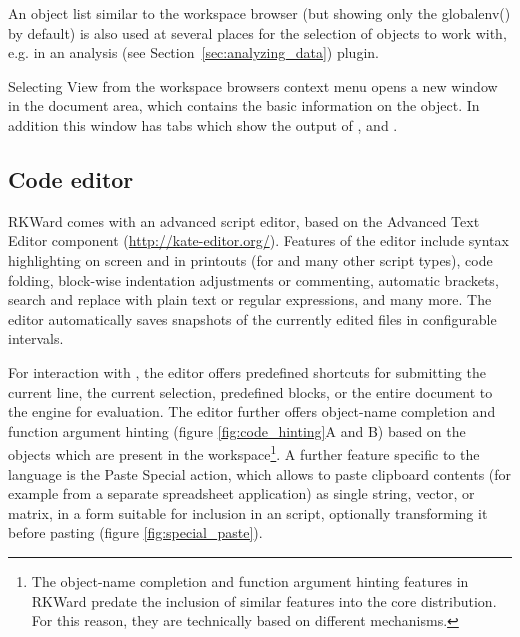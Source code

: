 An object list similar to the workspace browser (but showing only the
globalenv() by default) is also used at several places for the
selection of objects to work with, e.g. in an analysis (see Section~\ref{sec:analyzing_data})
plugin.

Selecting View from the workspace
browsers context menu opens a new window in the
document area, which contains the basic information on the object. In
addition this window has tabs which show the output of
, and .

\subsection{Code editor}
\label{sec:code_editor}

RKWard comes with an advanced
 script editor, based on the
 Advanced Text Editor component
(\url{http://kate-editor.org/}). Features of the
editor include syntax highlighting on screen and in printouts (for
 and many other script types), code
folding, block-wise indentation adjustments or commenting, automatic
brackets, search and replace with plain text or regular expressions,
and many more. The editor automatically saves snapshots of the
currently edited files in configurable intervals.

For interaction with , the editor offers
predefined shortcuts for submitting the current line, the current
selection, predefined blocks, or the entire document to the
 engine for evaluation. The editor further
offers object-name completion and function argument hinting (figure
\ref{fig:code_hinting}A and B) based on the objects which are present in
the  workspace\footnote{The object-name
completion and function argument hinting features in RKWard predate the
inclusion of similar features into the core
 distribution. For this reason, they are
technically based on different mechanisms.}. A further feature specific
to the  language is the
Paste Special action, which allows to
paste clipboard contents (for example from a separate spreadsheet
application) as single string, vector, or matrix, in a form suitable
for inclusion in an  script, optionally
transforming it before pasting (figure \ref{fig:special_paste}).

